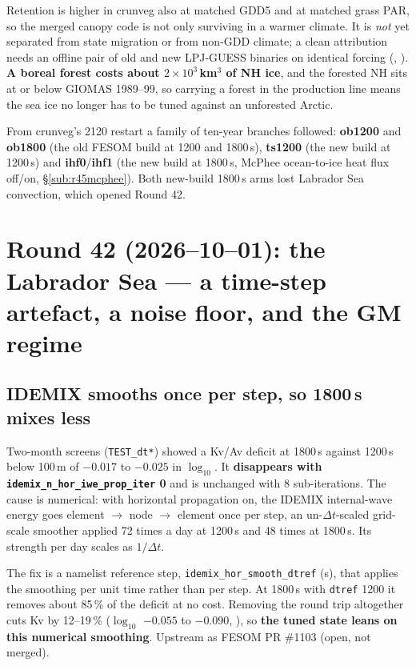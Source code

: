 \documentclass[10pt]{article}
\begin{document}
Retention is higher in crunveg also at matched GDD5 and at matched grass PAR, so the merged canopy
code is not only surviving in a warmer climate. It is \emph{not} yet separated from state
migration or from non-GDD climate; a clean attribution needs an offline pair of old and new
LPJ-GUESS binaries on identical forcing (,
). \textbf{A boreal forest costs about $2\times10^3$\,km$^3$ of NH ice}, and
the forested NH sits at or below GIOMAS 1989--99, so carrying a forest in the production line
means the sea ice no longer has to be tuned against an unforested Arctic.

From crunveg's 2120 restart a family of ten-year branches followed: \textbf{ob1200} and
\textbf{ob1800} (the old FESOM build at 1200 and 1800\,s), \textbf{ts1200} (the new build at
1200\,s) and \textbf{ihf0}/\textbf{ihf1} (the new build at 1800\,s, McPhee ocean-to-ice heat flux
off/on, \S\ref{sub:r45mcphee}). Both new-build 1800\,s arms lost Labrador Sea convection, which
opened Round 42.

\section{Round 42 (2026--10--01): the Labrador Sea --- a time-step artefact, a noise floor, and the GM regime}\label{sec:round42}

\subsection{IDEMIX smooths once per step, so 1800\,s mixes less}\label{sub:r42idemix}

Two-month screens (\texttt{TEST\_dt*}) showed a Kv/Av deficit at 1800\,s against 1200\,s below
100\,m of $-0.017$ to $-0.025$ in $\log_{10}$. It \textbf{disappears with
\texttt{idemix\_n\_hor\_iwe\_prop\_iter} 0} and is unchanged with 8 sub-iterations. The cause is
numerical: with horizontal propagation on, the IDEMIX internal-wave energy goes element $\to$
node $\to$ element once per step, an un-$\Delta t$-scaled grid-scale smoother applied 72 times a
day at 1200\,s and 48 times at 1800\,s. Its strength per day scales as $1/\Delta t$.

The fix is a namelist reference step, \texttt{idemix\_hor\_smooth\_dtref} (s), that applies the
smoothing per unit time rather than per step. At 1800\,s with \texttt{dtref} 1200 it removes about
85\,\% of the deficit at no cost. Removing the round trip altogether cuts Kv by 12--19\,\%
($\log_{10}$ $-0.055$ to $-0.090$, ), so \textbf{the tuned
state leans on this numerical smoothing}. Upstream as FESOM PR \#1103 (open, not merged).
\end{document}
